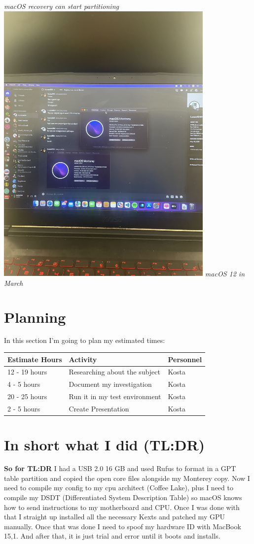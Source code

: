 \documentclass[12pt, letterpaper]{article}
\begin{document}
\break
\emph{macOS recovery can start partitioning}
\hfill\break
\hfill\break
\includegraphics[width=0.8\textwidth]{fotos/PSP/Outcomes/Running macos.jpeg}
\break
\emph{macOS 12 in March}
\newpage
\section{Planning}
In this section I'm going to plan my estimated times:
\hfill\break
    \begin{table}[htbp]
        \begin{tabular}{|l|l|l|}
            \hline
            Estimate Hours & Activity    & Personnel    \tabularnewline \hline
            12 - 19 hours   & Researching about the subject & Kosta \tabularnewline \hline
            4 - 5 hours  & Document my investigation & Kosta \tabularnewline 
            \hline
            20 - 25 hours & Run it in my test environment & Kosta \tabularnewline \hline
            2 - 5 hours & Create Presentation & Kosta \tabularnewline \hline
        \end{tabular}
    \end{table}
\section{In short what I did (TL:DR)}
\textbf{So for TL:DR}
\hfill\break
I had a USB 2.0 16 GB and used Rufus to format in a GPT table partition and copied the open core files alongside my Monterey copy. Now I need to compile my config to my cpu architect (Coffee Lake), plus I need to compile my DSDT (Differentiated System Description Table) so macOS knows how to send instructions to my motherboard and CPU. Once I was done with that I straight up installed all the necessary Kexts and patched my GPU manually. Once that was done I need to spoof my hardware ID with MacBook 15,1. And after that, it is just trial and error until it boots and installs.
\end{document}

